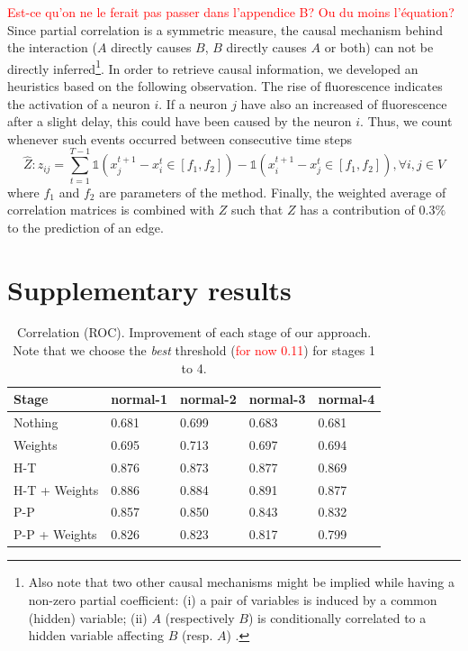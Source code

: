 \documentclass[wcp]{jmlr}
\begin{document}
\textcolor{red}{Est-ce qu'on ne le ferait pas passer dans l'appendice B? Ou du moins l'équation?}
Since partial correlation is a symmetric measure, the causal mechanism behind the
interaction ($A$ directly causes $B$, $B$ directly causes $A$ or both) can not
be directly inferred\footnote{Also note that two other causal mechanisms might be
implied while having a non-zero partial coefficient: (i) a pair of variables
is induced by a common (hidden) variable; (ii) $A$ (respectively $B$) is
conditionally correlated to a hidden variable affecting $B$ (resp. $A$)
\citep{de2004discovery}.}.
In order to retrieve causal information, we developed an
heuristics based on the following observation. The rise of fluorescence
indicates the activation of a neuron $i$. If a neuron $j$ have also
an increased of fluorescence after a slight delay, this could have been
caused by the neuron $i$. Thus, we count whenever
such events occurred between consecutive time steps
\[
\hat{Z}: z_{ij} = \sum_{t=1}^{T - 1}
    \mathbb{1}(x_j^{t+1} - x_i^t \in \left[f_1, f_2 \right]) -
    \mathbb{1}(x_i^{t+1} - x_j^t \in \left[f_1, f_2 \right]), \forall i, j \in V
\]
where $f_1$ and $f_2$ are parameters of the method.
Finally, the weighted average of correlation matrices is combined with $Z$ such
that $Z$ has a contribution of $0.3\%$ to the prediction of an edge.



\section{Supplementary results}

\begin{table}[htbp]
\centering
\caption{Correlation (ROC). Improvement of each stage of our approach. Note that we choose the
         \textit{best} threshold (\textcolor{red}{for now 0.11}) for stages 1 to 4.}
\begin{tabular}{*{5}{l}}
\toprule
Stage               & normal-1 & normal-2 & normal-3 & normal-4 \\
\midrule
Nothing             & 0.681 & 0.699 & 0.683 & 0.681\\
Weights             & 0.695 & 0.713 & 0.697 & 0.694\\
H-T                 & 0.876 & 0.873 & 0.877 & 0.869\\
H-T + Weights       & 0.886 & 0.884 & 0.891 & 0.877\\
P-P                 & 0.857 & 0.850 & 0.843 & 0.832\\
P-P + Weights       & 0.826 & 0.823 & 0.817 & 0.799\\
\bottomrule
\end{tabular}
\end{table}
\end{document}

